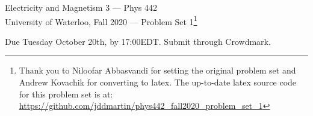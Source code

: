 \documentclass[12pt,geometry,width=8in]{article}
\begin{document}
\chead{}
\renewcommand{\headrulewidth}{0pt}

\begin{center}
  {\large
    Electricity and Magnetism 3 --- Phys 442  \\
    University of Waterloo, Fall 2020
    --- Problem Set 1\footnote{Thank you to Niloofar Abbasvandi for setting the original problem set and Andrew Kovachik for converting to latex.  The up-to-date latex source code for this problem set is at: \url{https://github.com/jddmartin/phys442_fall2020_problem_set_1}
}
    \par
  }
\end{center}

\vspace{0.1in}

Due Tuesday October 20th, by 17:00EDT.  Submit through Crowdmark.

\vspace{0.1in}

\noindent
\end{document}
